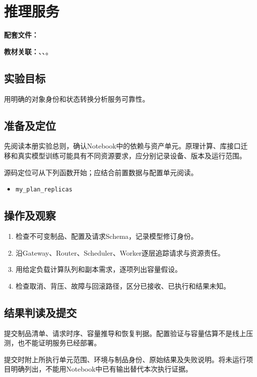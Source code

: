 \chapter{推理服务}
\label{lab:60_inference_deployment}

\noindent\textbf{配套文件：}\par
\noindent\textbf{教材关联：}、、。

\section*{实验目标}
用明确的对象身份和状态转换分析服务可靠性。

\section*{准备及定位}
先阅读本册实验总则，确认Notebook中的依赖与资产单元。原理计算、库接口迁移和真实模型训练可能具有不同资源要求，应分别记录设备、版本及运行范围。

源码定位可从下列函数开始；应结合前置数据与配置单元阅读。
\begin{itemize}
\item \texttt{my\_plan\_replicas}
\end{itemize}

\section*{操作及观察}
\begin{enumerate}
\item 检查不可变制品、配置及请求Schema，记录模型修订身份。
\item 沿Gateway、Router、Scheduler、Worker逐层追踪请求与资源责任。
\item 用给定负载计算队列和副本需求，逐项列出容量假设。
\item 检查取消、背压、故障与回滚路径，区分已接收、已执行和结果未知。
\end{enumerate}

\section*{结果判读及提交}
提交制品清单、请求时序、容量推导和恢复判据。配置验证与容量估算不是线上压测，也不能证明服务已经部署。

提交时附上所执行单元范围、环境与制品身份、原始结果及失败说明。将未运行项目明确列出，不能用Notebook中已有输出替代本次执行证据。



